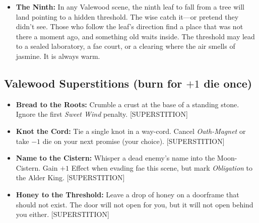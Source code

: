 \begin{itemize}
  \item \textbf{The Ninth:} In any Valewood scene, the ninth leaf to fall from a tree will land pointing to a hidden threshold. The wise catch it---or pretend they didn't see. Those who follow the leaf's direction find a place that was not there a moment ago, and something old waits inside. The threshold may lead to a sealed laboratory, a fae court, or a clearing where the air smells of jasmine. It is always warm.
\end{itemize}

\subsection*{Valewood Superstitions (burn for $+1$ die once)}
\begin{itemize}
  \item \textbf{Bread to the Roots:} Crumble a crust at the base of a standing stone. Ignore the first \emph{Sweet Wind} penalty. [SUPERSTITION]
  \item \textbf{Knot the Cord:} Tie a single knot in a way-cord. Cancel \emph{Oath-Magnet} or take $-1$ die on your next promise (your choice). [SUPERSTITION]
  \item \textbf{Name to the Cistern:} Whisper a dead enemy's name into the Moon-Cistern. Gain $+1$ Effect when evading fae this scene, but mark \emph{Obligation} to the Alder King. [SUPERSTITION]
  \item \textbf{Honey to the Threshold:} Leave a drop of honey on a doorframe that should not exist. The door will not open for you, but it will not open behind you either. [SUPERSTITION]
\end{itemize}

